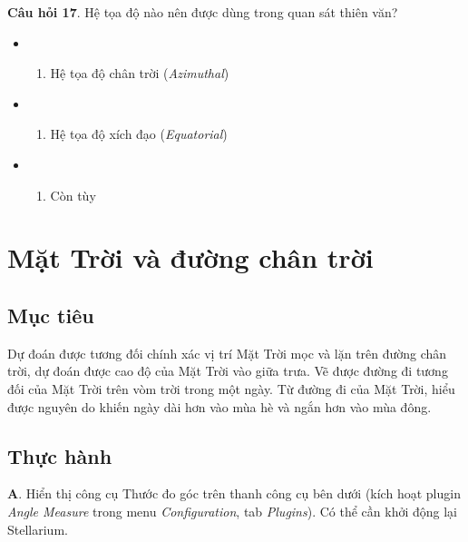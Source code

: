 \documentclass[
  a4paper,
]{book}
\providecommand{\tightlist}{%
  \setlength{\itemsep}{0pt}\setlength{\parskip}{0pt}}
\begin{document}
\textbf{Câu hỏi 17}. Hệ tọa độ nào nên được dùng trong quan sát thiên văn?

\begin{itemize}
\tightlist
\item
  \begin{enumerate}
  \def\labelenumi{(\Alph{enumi})}
  \tightlist
  \item
    Hệ tọa độ chân trời (\emph{Azimuthal})\\
  \end{enumerate}
\item
  \begin{enumerate}
  \def\labelenumi{(\Alph{enumi})}
  \setcounter{enumi}{1}
  \tightlist
  \item
    Hệ tọa độ xích đạo (\emph{Equatorial})\\
  \end{enumerate}
\item
  \begin{enumerate}
  \def\labelenumi{(\Alph{enumi})}
  \setcounter{enumi}{2}
  \tightlist
  \item
    Còn tùy
  \end{enumerate}
\end{itemize}

\chapter{Mặt Trời và đường chân trời}\label{mux1eb7t-trux1eddi-vuxe0-ux111ux1b0ux1eddng-chuxe2n-trux1eddi}

\section{Mục tiêu}\label{mux1ee5c-tiuxeau-1}

Dự đoán được tương đối chính xác vị trí Mặt Trời mọc và lặn trên đường chân trời, dự đoán được cao độ của Mặt Trời vào giữa trưa. Vẽ được đường đi tương đối của Mặt Trời trên vòm trời trong một ngày. Từ đường đi của Mặt Trời, hiểu được nguyên do khiến ngày dài hơn vào mùa hè và ngắn hơn vào mùa đông.

\section{Thực hành}\label{thux1ef1c-huxe0nh-1}

\textbf{A}. Hiển thị công cụ Thước đo góc trên thanh công cụ bên dưới (kích hoạt plugin \emph{Angle Measure} trong menu \emph{Configuration}, tab \emph{Plugins}). Có thể cần khởi động lại Stellarium.
\end{document}
